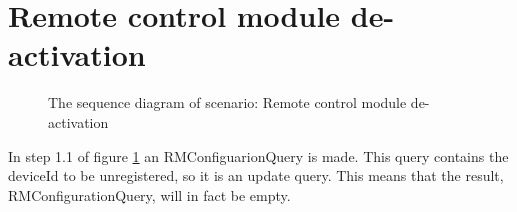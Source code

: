 \section{Remote control module de-activation}

\begin{figure}
	\begin{centering}
		\caption{The sequence diagram of scenario: Remote control module
		de-activation}
		\label{fig:scenario-5-12}
	\end{centering}
\end{figure}

\npar In step 1.1 of figure \ref{fig:scenario-5-12} an RMConfiguarionQuery is
made. This query contains the deviceId to be unregistered, so it is an
update query. This means that the result, RMConfigurationQuery, will in fact be
empty.
